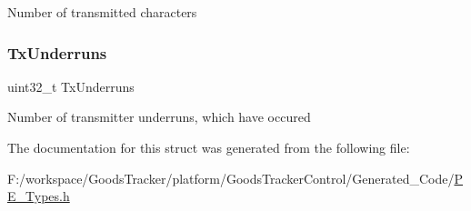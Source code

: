Number of transmitted characters \mbox{\label{struct_l_d_d___s_p_i_s_l_a_v_e___t_stats_a9bb1db011f85a3c7644080f7cc482925}} 
\subsubsection{\texorpdfstring{Tx\+Underruns}{TxUnderruns}}
{\footnotesize\ttfamily uint32\+\_\+t Tx\+Underruns}

Number of transmitter underruns, which have occured 

The documentation for this struct was generated from the following file\+:\begin{DoxyCompactItemize}
\item 
F\+:/workspace/\+Goods\+Tracker/platform/\+Goods\+Tracker\+Control/\+Generated\+\_\+\+Code/\hyperlink{_p_e___types_8h}{P\+E\+\_\+\+Types.\+h}\end{DoxyCompactItemize}
